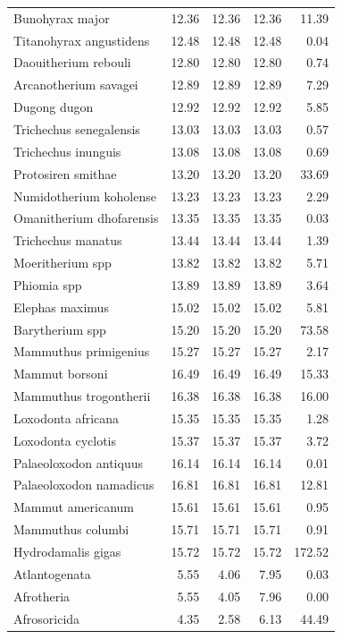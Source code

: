 \documentclass[]{elsarticle} %
\begin{document}
\begin{longtable}[t]{lrrrr}
Bunohyrax major & 12.36 & 12.36 & 12.36 & 11.39\\
\addlinespace
Titanohyrax angustidens & 12.48 & 12.48 & 12.48 & 0.04\\
Daouitherium rebouli & 12.80 & 12.80 & 12.80 & 0.74\\
Arcanotherium savagei & 12.89 & 12.89 & 12.89 & 7.29\\
Dugong dugon & 12.92 & 12.92 & 12.92 & 5.85\\
Trichechus senegalensis & 13.03 & 13.03 & 13.03 & 0.57\\
\addlinespace
Trichechus inunguis & 13.08 & 13.08 & 13.08 & 0.69\\
Protosiren smithae & 13.20 & 13.20 & 13.20 & 33.69\\
Numidotherium koholense & 13.23 & 13.23 & 13.23 & 2.29\\
Omanitherium dhofarensis & 13.35 & 13.35 & 13.35 & 0.03\\
Trichechus manatus & 13.44 & 13.44 & 13.44 & 1.39\\
\addlinespace
Moeritherium spp & 13.82 & 13.82 & 13.82 & 5.71\\
Phiomia spp & 13.89 & 13.89 & 13.89 & 3.64\\
Elephas maximus & 15.02 & 15.02 & 15.02 & 5.81\\
Barytherium spp & 15.20 & 15.20 & 15.20 & 73.58\\
Mammuthus primigenius & 15.27 & 15.27 & 15.27 & 2.17\\
\addlinespace
Mammut borsoni & 16.49 & 16.49 & 16.49 & 15.33\\
Mammuthus trogontherii & 16.38 & 16.38 & 16.38 & 16.00\\
Loxodonta africana & 15.35 & 15.35 & 15.35 & 1.28\\
Loxodonta cyclotis & 15.37 & 15.37 & 15.37 & 3.72\\
Palaeoloxodon antiquus & 16.14 & 16.14 & 16.14 & 0.01\\
\addlinespace
Palaeoloxodon namadicus & 16.81 & 16.81 & 16.81 & 12.81\\
Mammut americanum & 15.61 & 15.61 & 15.61 & 0.95\\
Mammuthus columbi & 15.71 & 15.71 & 15.71 & 0.91\\
Hydrodamalis gigas & 15.72 & 15.72 & 15.72 & 172.52\\
Atlantogenata & 5.55 & 4.06 & 7.95 & 0.03\\
\addlinespace
Afrotheria & 5.55 & 4.05 & 7.96 & 0.00\\
Afrosoricida & 4.35 & 2.58 & 6.13 & 44.49\\

\end{longtable}
\end{document}
